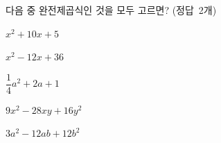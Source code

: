 다음 중 완전제곱식인 것을 모두 고르면? \mbox{(정답 2개)}
\begin{choicesii}{\rule[-3ex]{0pt}{8ex}$x^2+10x+5$}{\rule[-3ex]{0pt}{8ex}$x^2-12x+36$}{\rule[-3ex]{0pt}{8ex}$\dfrac{1}{4}a^2+2a+1$}{\rule[-3ex]{0pt}{8ex}$9x^2-28xy+16y^2$}{\rule[-3ex]{0pt}{8ex}$3a^2-12ab+12b^2$}\end{choicesii}
